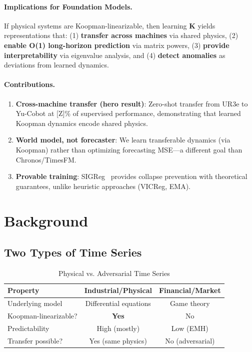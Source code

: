 \documentclass{article}
\begin{document}
\paragraph{Implications for Foundation Models.} If physical systems are Koopman-linearizable, then learning $\mathbf{K}$ yields representations that: (1) \textbf{transfer across machines} via shared physics, (2) \textbf{enable O(1) long-horizon prediction} via matrix powers, (3) \textbf{provide interpretability} via eigenvalue analysis, and (4) \textbf{detect anomalies} as deviations from learned dynamics.

\paragraph{Contributions.}
\begin{enumerate}
    \item \textbf{Cross-machine transfer (hero result)}: Zero-shot transfer from UR3e to Yu-Cobot at [Z]\% of supervised performance, demonstrating that learned Koopman dynamics encode shared physics.
    \item \textbf{World model, not forecaster}: We learn transferable dynamics (via Koopman) rather than optimizing forecasting MSE—a different goal than Chronos/TimesFM.
    \item \textbf{Provable training}: SIGReg~\cite{lejepa2024} provides collapse prevention with theoretical guarantees, unlike heuristic approaches (VICReg, EMA).
\end{enumerate}

\section{Background}

\subsection{Two Types of Time Series}

\begin{table}[h]
\centering
\caption{Physical vs. Adversarial Time Series}
\small
\begin{tabular}{@{}lcc@{}}
\toprule
\textbf{Property} & \textbf{Industrial/Physical} & \textbf{Financial/Market} \\
\midrule
Underlying model & Differential equations & Game theory \\
Koopman-linearizable? & \textbf{Yes} & No \\
Predictability & High (mostly) & Low (EMH) \\
Transfer possible? & Yes (same physics) & No (adversarial) \\
\bottomrule
\end{tabular}
\end{table}
\end{document}
